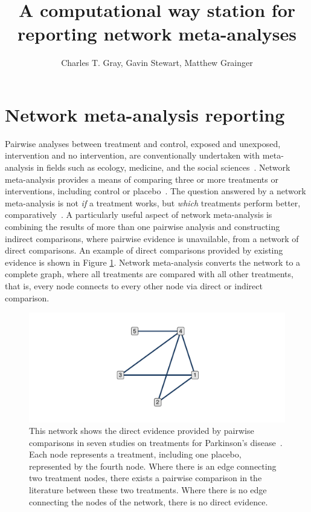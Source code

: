 \documentclass[12pt]{article}\usepackage[]{graphicx}\usepackage[]{color}
\title{A computational way station for reporting network meta-analyses}
\author{Charles T. Gray, Gavin Stewart, Matthew Grainger}
\makeatletter
\def\maxwidth{ %
  \ifdim\Gin@nat@width>\linewidth
    \linewidth
  \else
    \Gin@nat@width
  \fi
}
\newenvironment{knitrout}{}{} %
\makeatother
\begin{document}
\maketitle


\section{Network meta-analysis reporting}\label{sec:nma}


Pairwise analyses between treatment and control, exposed and unexposed, intervention and no intervention, are conventionally undertaken with meta-analysis in fields such as ecology, medicine, and the social sciences~\cite{borenstein_introduction_2011}. Network meta-analysis provides a means of comparing three or more treatments or interventions, including control or placebo~\cite{higgins2019cochrane}. The question answered by a network meta-analysis is not \emph{if} a treatment works, but \emph{which} treatments perform better, comparatively~\cite{harrer_doing_2019}. A particularly useful aspect of network meta-analysis is combining the results of more than one pairwise analysis and constructing indirect comparisons, where pairwise evidence is unavailable, from a network of direct comparisons. An example of direct comparisons provided by existing evidence is shown in Figure \ref{fig:network}. Network meta-analysis converts the network to a complete graph, where all treatments are compared with all other treatments, that is, every node connects to every other node via direct or indirect comparison.

\begin{figure}
\centering
\begin{knitrout}
\color{fgcolor}
\includegraphics[width=\maxwidth]{figure/network-1} 

\end{knitrout}
\caption{This network shows the direct evidence provided by pairwise comparisons in seven studies on treatments for Parkinson's disease~\cite{phillippo_multinma_2020}. Each node represents a treatment, including one placebo, represented by the fourth node. Where there is an edge connecting two treatment nodes, there exists a pairwise comparison in the literature between these two treatments. Where there is no edge connecting the nodes of the network, there is no direct evidence.}
\label{fig:network}
\end{figure}
\end{document}
